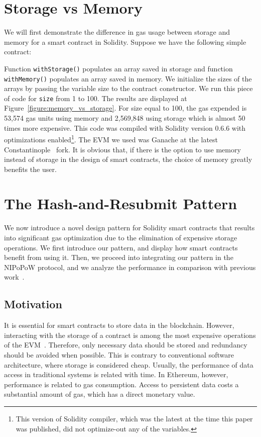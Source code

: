 % 

\section{Storage vs Memory}

We will first demonstrate the difference in gas usage between storage and
memory for a smart contract in Solidity. Suppose we have the following simple
contract:



Function \texttt{withStorage()} populates an array saved in storage and
function \texttt{withMemory()} populates an array saved in memory. We
initialize the sizes of the arrays by passing the variable \textsf{size} to the
contract constructor. We run this piece of code for \texttt{size} from 1 to
100. The results are displayed at Figure~\ref{figure:memory_vs_storage}. For
\textsf{size} equal to 100, the gas expended is 53,574 gas units using memory
and 2,569,848 using storage which is almost 50 times more expensive. This code
was compiled with Solidity version 0.6.6 with optimizations
enabled\footnote{This version of Solidity compiler, which was the latest at the
time this paper was published, did not optimize-out any of the variables.}. The
EVM we used  was Ganache at the latest Constantinople~\cite{constantinople}
fork. It is obvious that, if there is the option to use memory instead of
storage in the design of smart contracts, the choice of memory greatly benefits
the user.



\section{The Hash-and-Resubmit Pattern}

We now introduce a novel design pattern for Solidity smart contracts that
results into significant gas optimization due to the elimination of expensive
storage operations. We first introduce our pattern, and display how smart
contracts benefit from using it. Then, we proceed into integrating our pattern
in the NIPoPoW protocol, and we analyze the performance in comparison with
previous work~\cite{gglou}.

\subsection{Motivation}
It is essential for smart contracts to store data in the blockchain. However,
interacting with the storage of a contract is among the most expensive
operations of the EVM~\cite{wood, buterin}. Therefore, only necessary data
should be stored and redundancy should be avoided when possible. This is
contrary to conventional software architecture, where storage is considered
cheap. Usually, the performance of data access in traditional systems is
related with time. In Ethereum, however, performance is related to gas
consumption. Access to persistent data costs a substantial amount of gas, which
has a direct monetary value.

